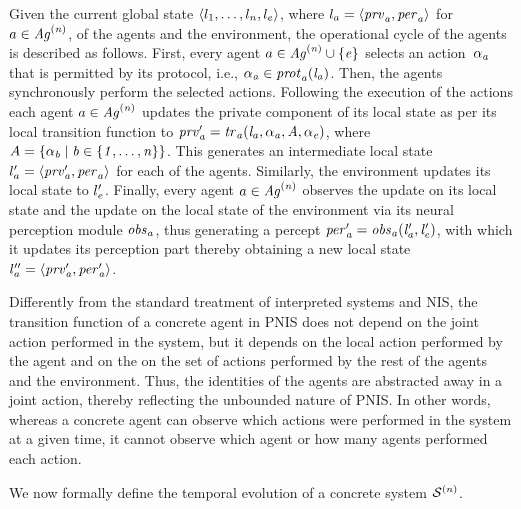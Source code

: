 Given the current global state $\left \langle l_{1}, \ldots, l_{n}, l_{e} \right \rangle$, where $l_{a} = \left \langle \it{prv}_{a}, \it{per}_{a} \right \rangle$ for $a \in \it{Ag}^{(n)}$, of the
agents and the environment, the operational cycle of the agents is described as
follows. First, every agent ${a} \in \it{Ag}^{(n)} \cup \left \{ {e} \right \}$ selects an
action~$\it{\alpha}_{a}$ that is permitted by its protocol, i.e., $\it{\alpha}_{a} \in \it{prot}_{a}
(l_{a})$. Then, the agents synchronously perform the selected actions.
Following  the execution of the actions each agent ${a} \in \it{Ag}^{(n)}$ updates
the private component of its local state as per its local transition function to
$\it{prv}'_{a} = \it{tr}_{a}( l_{a}, \it{\alpha}_{a}, A, \it{\alpha}_{e})$, where
$A = \left \{  \it{\alpha}_{b} \mid b \in \left \{ 1, \ldots, n \right \} \right \}$.  This
generates an intermediate local state $l'_{a} = \left \langle \it{prv}'_{a}, \it{per}_{a} \right \rangle$
for each of the agents. Similarly, the environment updates its local state to
$l'_{e}$. Finally, every agent ${a} \in \it{Ag}^{(n)}$ observes the update on
its local state and the update on the local state of the environment via its
neural perception module $\it{obs}_{a}$, thus generating a percept
$\it{per}'_{a} = \it{obs}_{a}(l'_{a}, l'_{e})$, with which it updates its
perception part thereby obtaining a new local state
$l''_{a} = \left \langle  \it{prv}'_{a}, \it{per}'_{a} \right \rangle$.


Differently from the standard treatment of interpreted systems and NIS, the
transition function of a concrete agent in PNIS  does not depend on the joint
action performed in the system, but it depends on the local action performed by
the  agent and on the on the set of actions performed by the rest of the agents
and the environment.  Thus, the identities of the agents are abstracted away in
a joint action, thereby reflecting the unbounded nature of PNIS. In other words,
whereas  a concrete agent can observe which actions were performed in the system
at a given time,  it cannot observe which agent or how many agents performed
each action.

We now formally define the temporal evolution of a concrete system
$\mathcal{S}^{(n)}$.



